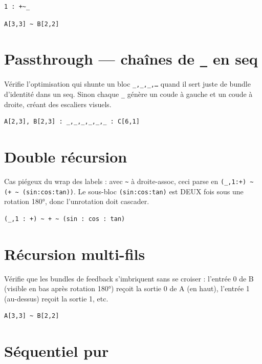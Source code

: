 \documentclass[11pt,a4paper]{article}
\theoremstyle{definition}
\begin{document}
\begin{lstlisting}
1 : +~_
\end{lstlisting}


\begin{lstlisting}
A[3,3] ~ B[2,2]
\end{lstlisting}


\section{Passthrough — chaînes de \texttt{\_} en seq}

Vérifie l'optimisation qui shunte un bloc \texttt{\_,\_,\_,…} quand il sert juste
de bundle d'identité dans un seq. Sinon chaque \texttt{\_} génère un coude à
gauche et un coude à droite, créant des escaliers visuels.


\begin{lstlisting}
A[2,3], B[2,3] : _,_,_,_,_,_ : C[6,1]
\end{lstlisting}


\section{Double récursion}

Cas piégeux du wrap des labels : avec \texttt{\textasciitilde{}} à droite-assoc, ceci parse
en \texttt{(\_,1:+) \textasciitilde{} (+ \textasciitilde{} (sin:cos:tan))}. Le sous-bloc \texttt{(sin:cos:tan)} est
DEUX fois sous une rotation 180°, donc l'unrotation doit cascader.


\begin{lstlisting}
(_,1 : +) ~ + ~ (sin : cos : tan)
\end{lstlisting}


\section{Récursion multi-fils}

Vérifie que les bundles de feedback s'imbriquent sans se croiser : l'entrée
0 de B (visible en bas après rotation 180°) reçoit la sortie 0 de A (en
haut), l'entrée 1 (au-dessus) reçoit la sortie 1, etc.


\begin{lstlisting}
A[3,3] ~ B[2,2]
\end{lstlisting}


\section{Séquentiel pur}
\end{document}
